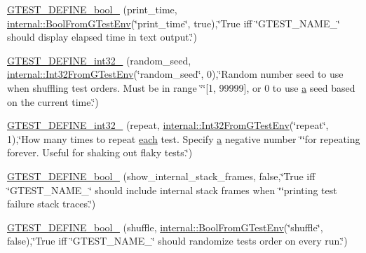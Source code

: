 \begin{DoxyCompactItemize}
\item 
\hyperlink{namespacetesting_a51fb68302e8e3fce5bd61340843a6e6a}{G\+T\+E\+S\+T\+\_\+\+D\+E\+F\+I\+N\+E\+\_\+bool\+\_\+} (print\+\_\+time, \hyperlink{namespacetesting_1_1internal_a67132cdce23fb71b6c38ee34ef81eb4c}{internal\+::\+Bool\+From\+G\+Test\+Env}(\char`\"{}print\+\_\+time\char`\"{}, true),\char`\"{}True iff \char`\"{}G\+T\+E\+S\+T\+\_\+\+N\+A\+M\+E\+\_\+\char`\"{} should display elapsed time in text output.\char`\"{})
\item 
\hyperlink{namespacetesting_a25e098abb7ce93d06582d48434be90c7}{G\+T\+E\+S\+T\+\_\+\+D\+E\+F\+I\+N\+E\+\_\+int32\+\_\+} (random\+\_\+seed, \hyperlink{namespacetesting_1_1internal_a0f7e728793f9e6cb0aa2b69eaa468bf3}{internal\+::\+Int32\+From\+G\+Test\+Env}(\char`\"{}random\+\_\+seed\char`\"{}, 0),\char`\"{}Random number seed to use when shuffling test orders.  Must be in range \char`\"{}\char`\"{}\mbox{[}1, 99999\mbox{]}, or 0 to use \hyperlink{_07copy_08_2_read_camera_model_8m_a551a3d351eadcc0b9b1a2f24f0fb5ea0}{a} seed based on the current time.\char`\"{})
\item 
\hyperlink{namespacetesting_a8b2c1dad0764e0984486bae49a988f0e}{G\+T\+E\+S\+T\+\_\+\+D\+E\+F\+I\+N\+E\+\_\+int32\+\_\+} (repeat, \hyperlink{namespacetesting_1_1internal_a0f7e728793f9e6cb0aa2b69eaa468bf3}{internal\+::\+Int32\+From\+G\+Test\+Env}(\char`\"{}repeat\char`\"{}, 1),\char`\"{}How many times to repeat \hyperlink{jquery_8js_a871ff39db627c54c710a3e9909b8234c}{each} test.  Specify \hyperlink{_07copy_08_2_read_camera_model_8m_a551a3d351eadcc0b9b1a2f24f0fb5ea0}{a} negative number \char`\"{}\char`\"{}for repeating forever.  Useful for shaking out flaky tests.\char`\"{})
\item 
\hyperlink{namespacetesting_a5982e64522de6804cbf5d1732fd62751}{G\+T\+E\+S\+T\+\_\+\+D\+E\+F\+I\+N\+E\+\_\+bool\+\_\+} (show\+\_\+internal\+\_\+stack\+\_\+frames, false,\char`\"{}True iff \char`\"{}G\+T\+E\+S\+T\+\_\+\+N\+A\+M\+E\+\_\+\char`\"{} should include internal stack frames when \char`\"{}\char`\"{}printing test failure stack traces.\char`\"{})
\item 
\hyperlink{namespacetesting_acc11444cd1c18500658a35e02d4f2cf9}{G\+T\+E\+S\+T\+\_\+\+D\+E\+F\+I\+N\+E\+\_\+bool\+\_\+} (shuffle, \hyperlink{namespacetesting_1_1internal_a67132cdce23fb71b6c38ee34ef81eb4c}{internal\+::\+Bool\+From\+G\+Test\+Env}(\char`\"{}shuffle\char`\"{}, false),\char`\"{}True iff \char`\"{}G\+T\+E\+S\+T\+\_\+\+N\+A\+M\+E\+\_\+\char`\"{} should randomize tests\textquotesingle{} order on every run.\char`\"{})
\item 

\end{DoxyCompactItemize}
